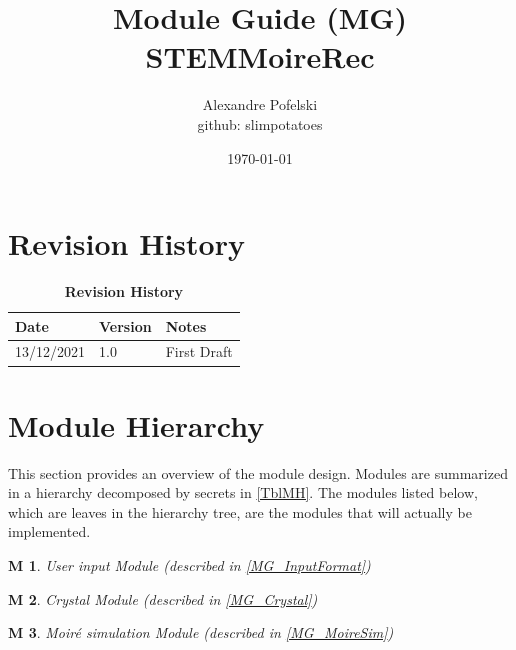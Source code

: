 \documentclass[12pt, titlepage]{article}
\newtheorem{M}{M}
\begin{document}
\title{Module Guide (MG) \\
STEMMoireRec} 
\author{Alexandre Pofelski \\
		github: slimpotatoes}
\date{\today}

\maketitle


\section{Revision History}

\begin{table}[h]
\caption{\bf Revision History}
\begin{tabularx}{\textwidth}{p{3cm}p{2cm}X}
\toprule {\bf Date} & {\bf Version} & {\bf Notes}\\
\midrule
13/12/2021 & 1.0 & First Draft\\
\bottomrule
\end{tabularx}
\end{table}

\newpage

\tableofcontents

\listoftables

\listoffigures

\newpage


\section{Module Hierarchy} \label{SecMH}

This section provides an overview of the module design. Modules are summarized
in a hierarchy decomposed by secrets in \cref{TblMH}. The modules listed
below, which are leaves in the hierarchy tree, are the modules that will
actually be implemented.

\begin{M}\normalfont User input Module (described in \cref{MG_InputFormat})
\label{M_InputFormat}
\end{M}

\begin{M}\normalfont Crystal Module (described in \cref{MG_Crystal})
\label{M_Crystal}
\end{M}

\begin{M}\normalfont Moir{\'e} simulation Module (described in \cref{MG_MoireSim})
\label{M_MoireSim}
\end{M}
\end{document}

